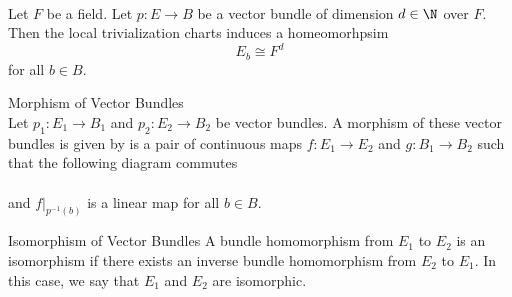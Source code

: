 \documentclass[a4paper]{article}
\begin{document}
\begin{lmm}{}{}\\
Let $F$ be a field. Let $p:E\to B$ be a vector bundle of dimension $d\in\N$ over $F$. Then the local trivialization charts induces a homeomorhpsim $$E_b\cong F^d$$ for all $b\in B$. 
\end{lmm}

\begin{defn}{Morphism of Vector Bundles}{}\\
Let $p_1:E_1\to B_1$ and $p_2:E_2\to B_2$ be vector bundles. A morphism of these vector bundles is given by is a pair of continuous maps $f:E_1\to E_2$ and $g:B_1\to B_2$ such that the following diagram commutes \\
 \\
and $f|_{p^{-1}(b)}$ is a linear map for all $b\in B$. 
\end{defn}

\begin{defn}{Isomorphism of Vector Bundles}{} A bundle homomorphism from $E_1$ to $E_2$ is an isomorphism if there exists an inverse bundle homomorphism from $E_2$ to $E_1$. In this case, we say that $E_1$ and $E_2$ are isomorphic. 
\end{defn}
\end{document}

